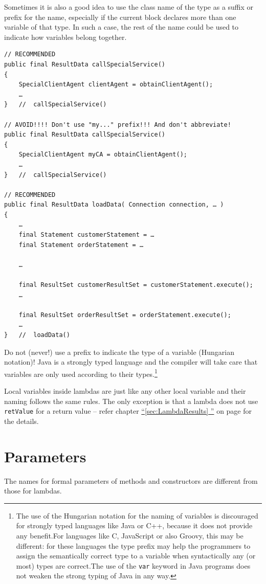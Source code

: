 \documentclass[12pt,a4paper,titlepage, parskip=half, headsepline, footsepline, cleardoubleplain]{scrbook}
\newcommand*{\tqfullvref}[1]{\hyperref[{#1}]{“\ref*{#1} \nameref*{#1}”} on page \pageref{#1}}
\begin{document}
Sometimes it is also a good idea to use the class name of the type as a suffix or prefix for the name, especially if the current block declares more than one variable of that type. In such a case, the rest of the name could be used to indicate how variables belong together.
\begin{lstlisting}
// RECOMMENDED
public final ResultData callSpecialService()
{
    SpecialClientAgent clientAgent = obtainClientAgent();
    …
}   //  callSpecialService()

// AVOID!!!! Don't use "my..." prefix!!! And don't abbreviate!
public final ResultData callSpecialService()
{
    SpecialClientAgent myCA = obtainClientAgent();
    …
}   //  callSpecialService()

// RECOMMENDED
public final ResultData loadData( Connection connection, … )
{
    …
    final Statement customerStatement = …
    final Statement orderStatement = …

    …

    final ResultSet customerResultSet = customerStatement.execute();
    …

    final ResultSet orderResultSet = orderStatement.execute();
    …
}   //  loadData()
\end{lstlisting}

Do not (never!) use a prefix to indicate the type of a variable (Hungarian notation)! Java is a strongly typed language and the compiler will take care that variables are only used according to their types.\footnote{The use of the Hungarian notation for the naming of variables is discouraged for strongly typed languages like Java or C++, because it does not provide any benefit.\newline For languages like C, JavaScript or also Groovy, this may be different: for these languages the type prefix may help the programmers to assign the semantically correct type to a variable when syntactically any (or most) types are correct.\newline The use of the \lstinline|var| keyword in Java programs does not weaken the strong typing of Java in any way.}

Local variables inside lambdas are just like any other local variable and their naming follows the same rules. The only exception is that a lambda does not use \lstinline|retValue| for a return value – refer chapter \tqfullvref{sec:LambdaResults} for the details.

\section{Parameters}
The names for formal parameters of methods and constructors are different from those for lambdas.
\end{document}
